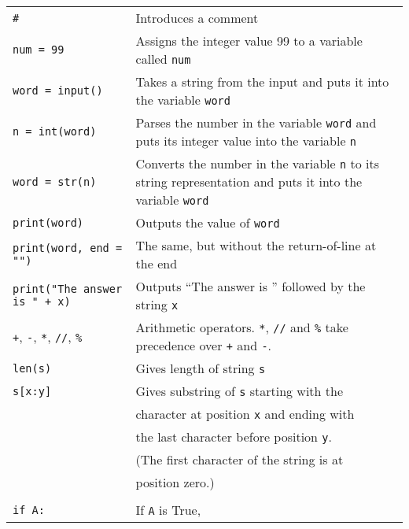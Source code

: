 
\begin{tabular}{p{6cm}p{7.2cm}}
\texttt{\#} & Introduces a comment\\
\texttt{num = 99} & Assigns the integer value 99 to a variable called \texttt{num}\\
\texttt{word = input()} & Takes a string from the input and puts it
into the variable \texttt{word} \\
\texttt{n = int(word)} & Parses the number in the variable
\texttt{word} and puts its integer value into the variable \texttt{n}
\\
\texttt{word = str(n)} & Converts the number in the variable
\texttt{n} to its string representation and puts it into the variable \texttt{word} \\
\texttt{print(word)} & Outputs the value of \texttt{word}\\
\texttt{print(word, end = "")} & The same, but without the return-of-line at the end\\
\texttt{print("The answer is " + x)} & Outputs ``The answer is '' followed by the string \texttt{x}\\
\texttt{+}, \texttt{-}, \texttt{*}, \texttt{//}, \texttt{\%} & Arithmetic operators.  \texttt{*}, \texttt{//} and \texttt{\%} take precedence over \texttt{+} and \texttt{-}.\\
\texttt{len(s)} & Gives length of string \texttt{s}\\
\texttt{s[x:y]} & Gives substring of \texttt{s} starting with the \\
                  & character at position \texttt{x} and ending with \\
                  & the last character before position \texttt{y}.\\
                  & (The first character of the string is at \\ 
                  & position zero.)\\
\\
\verb!if A:!    & If \texttt{A} is True,\\

\end{tabular}
